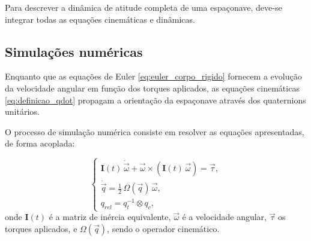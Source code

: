 Para descrever a dinâmica de atitude completa de uma espaçonave, deve-se integrar todas as equações cinemáticas e dinâmicas.

\subsection{Simulações numéricas}

Enquanto que as equações de Euler
\eqref{eq:euler_corpo_rigido}
fornecem a evolução da velocidade angular em função dos torques aplicados, as equações cinemáticas
\eqref{eq:definicao_qdot} propagam a orientação da espaçonave através dos quaternions unitários. 

O processo de simulação numérica consiste em resolver as equações apresentadas, de forma acoplada:

\begin{equation}
\begin{cases}
\mathbf{I}(t)\,\dot{\vec{\omega}}+\vec{\omega}\times(\mathbf{I}(t)\,\vec{\omega})
= \vec\tau, \\[6pt]
\dot{\vec{q}}
= \tfrac{1}{2}\,\Omega(\vec{q})\,\vec{\omega}, \\[6pt]
q_{rel}
= q_t^{-1} \otimes q_c,
\end{cases}
\label{eq:sistema_acoplado}
\end{equation}
onde $\mathbf{I}(t)$ é a matriz de inércia equivalente, $\vec{\omega}$ é a velocidade angular, $\vec\tau$ os torques aplicados, e $\Omega(\vec{q})$, sendo o operador cinemático.

